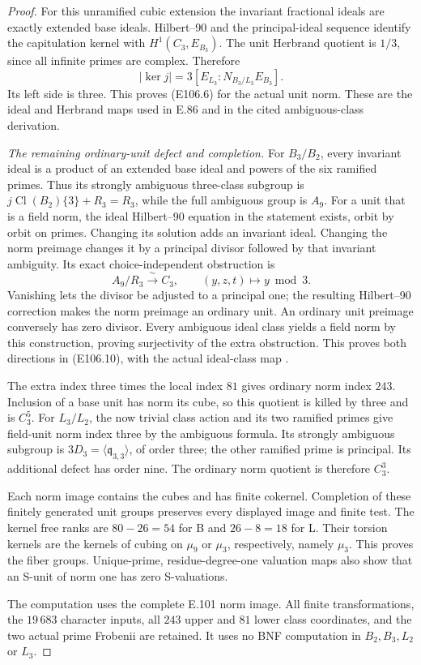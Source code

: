 \begin{proof}
For this unramified cubic extension the invariant
fractional ideals are exactly extended base ideals.
Hilbert--90 and the principal-ideal sequence identify the
capitulation kernel with $H^1(C_3,E_{B_3})$.
The unit Herbrand quotient is $1/3$, since all infinite
primes are complex. Therefore
\[
                  |\ker j|=3[E_{L_3}:N_{B_3/L_3}E_{B_3}].
 \tag{E106.19}
\]
Its left side is three. This proves (E106.6) for the
actual unit norm. These are the ideal and Herbrand maps
used in E.86 and in the cited ambiguous-class derivation.

\emph{The remaining ordinary-unit defect and completion.}
For $B_3/B_2$, every invariant ideal is a product of an
extended base ideal and powers of the six ramified primes.
Thus its strongly ambiguous three-class subgroup is
$j\operatorname{Cl}(B_2)\{3\}+R_3=R_3$, while the full
ambiguous group is $A_9$. For a unit that is a field norm,
the ideal Hilbert--90 equation in the statement exists,
orbit by orbit on primes. Changing its solution adds an
invariant ideal. Changing the norm preimage changes it
by a principal divisor followed by that invariant ambiguity.
Its exact choice-independent obstruction is
\[
                 A_9/R_3\xrightarrow{\ \sim\ }C_3,\qquad
                 (y,z,t)\longmapsto y\bmod3 .
 \tag{E106.20}
\]
Vanishing lets the divisor be adjusted to a principal one;
the resulting Hilbert--90 correction makes the norm preimage
an ordinary unit. An ordinary unit preimage conversely has
zero divisor. Every ambiguous ideal class yields a field
norm by this construction, proving surjectivity of the
extra obstruction. This proves both directions in
(E106.10), with the actual ideal-class map
\cite[Proposition1]{E_LemmermeyerAmbiguous}.

The extra index three times the local index $81$ gives
ordinary norm index $243$. Inclusion of a base unit has
norm its cube, so this quotient is killed by three and is
$C_3^5$. For $L_3/L_2$, the now trivial class action and
its two ramified primes give field-unit norm index three
by the ambiguous formula. Its strongly ambiguous subgroup
is $3D_3=\langle\mathfrak q_{3,3}\rangle$, of order three;
the other ramified prime is principal. Its additional
defect has order nine. The ordinary norm quotient is
therefore $C_3^3$.

Each norm image contains the cubes and has finite cokernel.
Completion of these finitely generated unit groups preserves
every displayed image and finite test. The kernel free ranks
are $80-26=54$ for B and $26-8=18$ for L. Their torsion
kernels are the kernels of cubing on $\mu_9$ or $\mu_3$,
respectively, namely $\mu_3$. This proves the fiber groups.
Unique-prime, residue-degree-one valuation maps also show
that an S-unit of norm one has zero S-valuations.

The computation uses the complete E.101 norm image.
All finite transformations, the $19\,683$ character inputs,
all $243$ upper and $81$ lower class coordinates, and the
two actual prime Frobenii are retained. It uses no BNF
computation in $B_2,B_3,L_2$ or $L_3$.
\end{proof}
